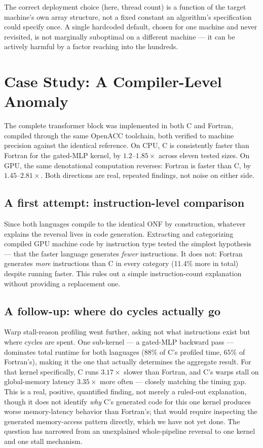 \documentclass[conference]{IEEEtran}
\begin{document}
The correct deployment choice (here, thread count) is a function of
the target machine's own array structure, not a fixed constant an
algorithm's specification could specify once. A single hardcoded
default, chosen for one machine and never revisited, is not marginally
suboptimal on a different machine --- it can be actively harmful by a
factor reaching into the hundreds.

\section{Case Study: A Compiler-Level Anomaly}
\label{sec:langauge}

The complete transformer block was implemented in both C and Fortran,
compiled through the same OpenACC toolchain, both verified to machine
precision against the identical reference. On CPU, C is consistently
faster than Fortran for the gated-MLP kernel, by $1.2$--$1.85\times$
across eleven tested sizes. On GPU, the same denotational computation
reverses: Fortran is faster than C, by $1.45$--$2.81\times$. Both
directions are real, repeated findings, not noise on either side.

\subsection{A first attempt: instruction-level comparison}

Since both languages compile to the identical ONF by construction,
whatever explains the reversal lives in code generation. Extracting
and categorizing compiled GPU machine code by instruction type tested
the simplest hypothesis --- that the faster language generates
\emph{fewer} instructions. It does not: Fortran generates \emph{more}
instructions than C in every category (11.4\% more in total) despite
running faster. This rules out a simple instruction-count explanation
without providing a replacement one.

\subsection{A follow-up: where do cycles actually go}

Warp stall-reason profiling went further, asking not what instructions
exist but where cycles are spent. One sub-kernel --- a gated-MLP
backward pass --- dominates total runtime for both languages ($88\%$
of C's profiled time, $65\%$ of Fortran's), making it the one that
actually determines the aggregate result. For that kernel specifically,
C runs $3.17\times$ slower than Fortran, and C's warps stall on
global-memory latency $3.35\times$ more often --- closely matching the
timing gap. This is a real, positive, quantified finding, not merely a
ruled-out explanation, though it does not identify \emph{why} C's
generated code for this one kernel produces worse memory-latency
behavior than Fortran's; that would require inspecting the generated
memory-access pattern directly, which we have not yet done. The
question has narrowed from an unexplained whole-pipeline reversal to
one kernel and one stall mechanism.
\end{document}
